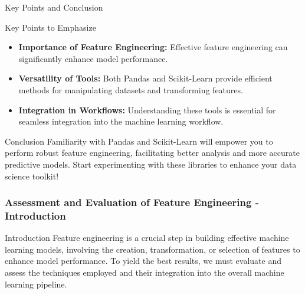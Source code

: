 \documentclass[aspectratio=169]{beamer}
\begin{document}
\begin{frame}[fragile]{Key Points and Conclusion}
    \begin{block}{Key Points to Emphasize}
        \begin{itemize}
            \item \textbf{Importance of Feature Engineering:} Effective feature engineering can significantly enhance model performance.
            \item \textbf{Versatility of Tools:} Both Pandas and Scikit-Learn provide efficient methods for manipulating datasets and transforming features.
            \item \textbf{Integration in Workflows:} Understanding these tools is essential for seamless integration into the machine learning workflow.
        \end{itemize}
    \end{block}

    \begin{block}{Conclusion}
        Familiarity with Pandas and Scikit-Learn will empower you to perform robust feature engineering, facilitating better analysis and more accurate predictive models. Start experimenting with these libraries to enhance your data science toolkit!
    \end{block}
\end{frame}

\begin{frame}[fragile]
    \frametitle{Assessment and Evaluation of Feature Engineering - Introduction}
    \begin{block}{Introduction}
        Feature engineering is a crucial step in building effective machine learning models, involving the creation, transformation, or selection of features to enhance model performance. 
        To yield the best results, we must evaluate and assess the techniques employed and their integration into the overall machine learning pipeline.
    \end{block}
\end{frame}
\end{document}

